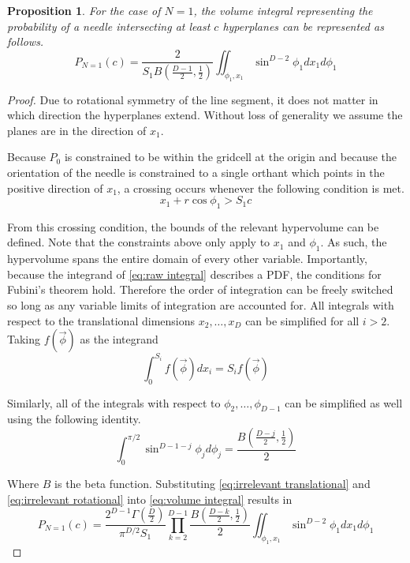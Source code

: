 \documentclass{article}
\newtheorem{proposition}{Proposition}
\begin{document}
\begin{proposition}
	For the case of $N=1$, the volume integral representing the probability of a needle intersecting at least $c$ hyperplanes
	can be represented as follows.
	\begin{equation*}
		P_{N=1}(c) = \frac{2}{S_1B(\frac{D-1}{2}, \frac{1}{2})} \iint_{\phi_1,x_1}\sin^{D-2}\phi_1 dx_1 d\phi_1
	\end{equation*}
\end{proposition}
\begin{proof}
	Due to rotational symmetry of the line segment, it does not matter in which direction the hyperplanes extend. Without loss of
	generality we assume the planes are in the direction of $x_1$.

	Because $P_0$ is constrained to be within the gridcell at the origin and because the orientation of the needle is constrained to a single
	orthant which points in the positive direction of $x_1$, a crossing occurs whenever the following condition is met.
	\begin{equation}
		x_1 + r\cos{\phi_1} > S_1c
	\end{equation}

	From this crossing condition, the bounds of the relevant hypervolume can be defined. Note that the constraints above only apply to $x_1$ and
	$\phi_1$. As such, the hypervolume spans the entire domain of every other variable. Importantly, because the integrand of \ref{eq:raw integral}
	describes a PDF, the conditions for Fubini's theorem hold. Therefore the order of integration can be freely switched so long as any variable
	limits of integration are accounted for. All integrals with respect to the translational dimensions $x_2, \hdots, x_D$ can be simplified
	for all $i>2$. Taking $f(\vec\phi)$ as the integrand
	\begin{equation}
		\int_0^{S_i}f(\vec\phi)dx_i = S_if(\vec\phi) \label{eq:irrelevant translational}
	\end{equation}

	Similarly, all of the integrals with respect to $\phi_2, \hdots, \phi_{D-1}$ can be simplified as well using the following identity.
	\begin{equation}
		\int_0^{\pi/2}\sin^{D-1-j}\phi_jd\phi_j = \frac{B(\frac{D-j}{2}, \frac{1}{2})}{2}\label{eq:irrelevant rotational}
	\end{equation}

	Where $B$ is the beta function. Substituting \ref{eq:irrelevant translational} and \ref{eq:irrelevant rotational} into 
	\ref{eq:volume integral} results in
	\begin{equation} \label{eq:preproduct simplification}
		P_{N=1}(c) = \frac{2^{D-1}\Gamma(\frac{D}{2})}{\pi^{D/2}S_1} \prod_{k=2}^{D-1}\frac{B(\frac{D-k}{2}, \frac{1}{2})}{2} \iint_{\phi_1,x_1}\sin^{D-2}\phi_1 dx_1 d\phi_1
	\end{equation}


\end{proof}
\end{document}

